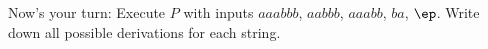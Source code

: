 Now's your turn: Execute $P$ with inputs $aaabbb$, $aabbb$, $aaabb$, 
$ba$, $\ep$.
Write down all possible derivations for each string.
